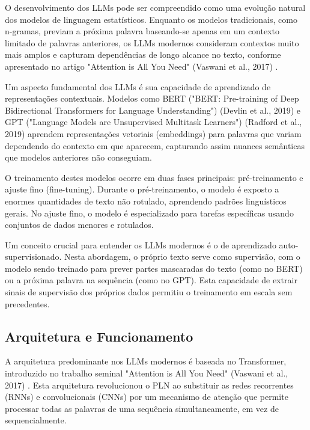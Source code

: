 \documentclass[tcc,capa]{texufpel}
\begin{document}
O desenvolvimento dos LLMs pode ser compreendido como uma evolução natural dos modelos de linguagem estatísticos. Enquanto os modelos tradicionais, como n-gramas, previam a próxima palavra baseando-se apenas em um contexto limitado de palavras anteriores, os LLMs modernos consideram contextos muito mais amplos e capturam dependências de longo alcance no texto, conforme apresentado no artigo "Attention is All You Need" (Vaswani et al., 2017) \cite{vaswani2017attention}.

Um aspecto fundamental dos LLMs é sua capacidade de aprendizado de representações contextuais. Modelos como BERT ("BERT: Pre-training of Deep Bidirectional Transformers for Language Understanding") (Devlin et al., 2019) \cite{devlin2019bert} e GPT ("Language Models are Unsupervised Multitask Learners") (Radford et al., 2019) \cite{radford2019language} aprendem representações vetoriais (embeddings) para palavras que variam dependendo do contexto em que aparecem, capturando assim nuances semânticas que modelos anteriores não conseguiam.

O treinamento destes modelos ocorre em duas fases principais: pré-treinamento e ajuste fino (fine-tuning). Durante o pré-treinamento, o modelo é exposto a enormes quantidades de texto não rotulado, aprendendo padrões linguísticos gerais. No ajuste fino, o modelo é especializado para tarefas específicas usando conjuntos de dados menores e rotulados.

Um conceito crucial para entender os LLMs modernos é o de aprendizado auto-supervisionado. Nesta abordagem, o próprio texto serve como supervisão, com o modelo sendo treinado para prever partes mascaradas do texto (como no BERT) ou a próxima palavra na sequência (como no GPT). Esta capacidade de extrair sinais de supervisão dos próprios dados permitiu o treinamento em escala sem precedentes.

\subsection{Arquitetura e Funcionamento}

A arquitetura predominante nos LLMs modernos é baseada no Transformer, introduzido no trabalho seminal "Attention is All You Need" (Vaswani et al., 2017) \cite{vaswani2017attention}. Esta arquitetura revolucionou o PLN ao substituir as redes recorrentes (RNNs) e convolucionais (CNNs) por um mecanismo de atenção que permite processar todas as palavras de uma sequência simultaneamente, em vez de sequencialmente.
\end{document}
